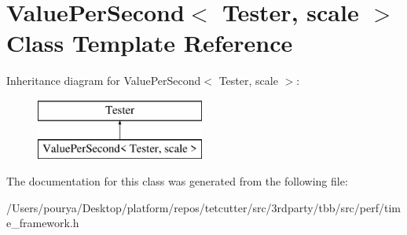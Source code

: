 \hypertarget{classValuePerSecond}{}\section{Value\+Per\+Second$<$ Tester, scale $>$ Class Template Reference}
\label{classValuePerSecond}
Inheritance diagram for Value\+Per\+Second$<$ Tester, scale $>$\+:\begin{figure}[H]
\begin{center}
\leavevmode
\includegraphics[height=2.000000cm]{classValuePerSecond}
\end{center}
\end{figure}


The documentation for this class was generated from the following file\+:\begin{DoxyCompactItemize}
\item 
/\+Users/pourya/\+Desktop/platform/repos/tetcutter/src/3rdparty/tbb/src/perf/time\+\_\+framework.\+h\end{DoxyCompactItemize}
